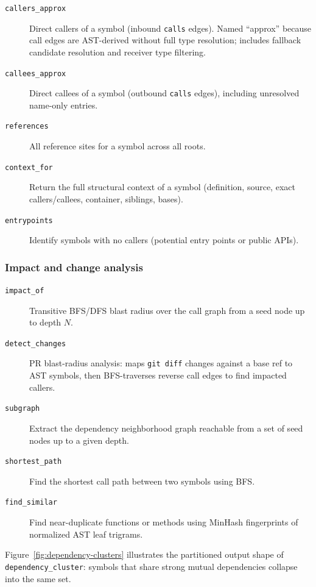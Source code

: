 \begin{description}
  \item[\texttt{callers\_approx}] Direct callers of a symbol (inbound
        \texttt{calls} edges). Named ``approx'' because call edges are
        AST-derived without full type resolution; includes fallback candidate
        resolution and receiver type filtering.
  \item[\texttt{callees\_approx}] Direct callees of a symbol (outbound
        \texttt{calls} edges), including unresolved name-only entries.
  \item[\texttt{references}] All reference sites for a symbol across all roots.
  \item[\texttt{context\_for}] Return the full structural context of a symbol
        (definition, source, exact callers/callees, container, siblings, bases).
  \item[\texttt{entrypoints}] Identify symbols with no callers (potential
        entry points or public APIs).
\end{description}

\subsubsection{Impact and change analysis}

\begin{description}
  \item[\texttt{impact\_of}] Transitive BFS/DFS blast radius over the call
        graph from a seed node up to depth $N$.
  \item[\texttt{detect\_changes}] PR blast-radius analysis: maps \texttt{git diff}
        changes against a base ref to AST symbols, then BFS-traverses reverse
        call edges to find impacted callers.
  \item[\texttt{subgraph}] Extract the dependency neighborhood graph reachable
        from a set of seed nodes up to a given depth.
  \item[\texttt{shortest\_path}] Find the shortest call path between two
        symbols using BFS.
  \item[\texttt{find\_similar}] Find near-duplicate functions or methods using
        MinHash fingerprints of normalized AST leaf trigrams.
\end{description}

Figure~\ref{fig:dependency-clusters} illustrates the partitioned output shape
of \texttt{dependency\_cluster}: symbols that share strong mutual dependencies
collapse into the same set.

